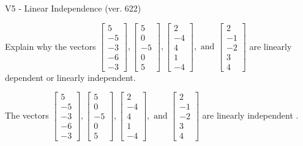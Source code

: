 \begin{exercise}
  \begin{exerciseTitle}V5 - Linear Independence (ver. 622)\end{exerciseTitle}
  \begin{exerciseStatement}
    Explain why the vectors \(\left[\begin{array}{r}
5 \\
-5 \\
-3 \\
-6 \\
-3
\end{array}\right] , \left[\begin{array}{r}
5 \\
0 \\
-5 \\
0 \\
5
\end{array}\right] , \left[\begin{array}{r}
2 \\
-4 \\
4 \\
1 \\
-4
\end{array}\right] , \text{ and } \left[\begin{array}{r}
2 \\
-1 \\
-2 \\
3 \\
4
\end{array}\right]\) are linearly dependent or linearly independent.	


  \end{exerciseStatement}
  \begin{exerciseAnswer}
   The vectors \(\left[\begin{array}{r}
5 \\
-5 \\
-3 \\
-6 \\
-3
\end{array}\right] , \left[\begin{array}{r}
5 \\
0 \\
-5 \\
0 \\
5
\end{array}\right] , \left[\begin{array}{r}
2 \\
-4 \\
4 \\
1 \\
-4
\end{array}\right] , \text{ and } \left[\begin{array}{r}
2 \\
-1 \\
-2 \\
3 \\
4
\end{array}\right]\) are 
  	 linearly independent  .
  


  \end{exerciseAnswer}
\end{exercise}